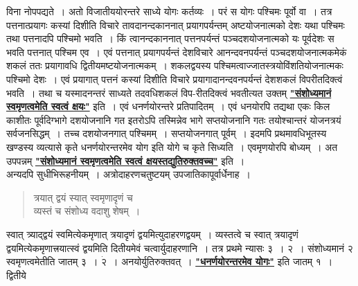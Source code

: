 \documentclass[11pt, openany]{book}
\begin{document}
\noindent विना नोपपद्यते~। अतो विजातीययोरन्तरे साध्ये योगः कर्तव्यः~। परं स योगः पश्चिमः पूर्वो वा~। तत्र पत्तनात्प्रयागः कस्यां दिशीति विचारे
तावदानन्दकाननात् प्रयागपर्यन्तम् अष्टयोजनात्मको देशः यथा पश्चिमः तथा पत्तनादपि पश्चिमो भवति~। किं त्वानन्दकाननात् पत्तनपर्यन्तं पञ्चदशयोजनात्मको यः पूर्वदेशः
स भवति पत्तनात् पश्चिम एव~। एवं पत्तनात् प्रयागपर्यन्तं देशविचारे
आनन्दवनपर्यन्तं पञ्चदशयोजनात्मकमेकं शकलं ततः प्रयागावधि
द्वितीयमष्टयोजनात्मकम्~। शकलद्वयस्य पश्चिमत्वाज्जातस्त्रयोविंशतियोजनात्मकः पश्चिमो देशः~। एवं प्रयागात् पत्तनं कस्यां दिशीति विचारे प्रयागादानन्दवनपर्यन्तं
देशशकलं विपरीतदिक्त्वं भवति~। तथा च यस्मादनन्तरं साध्यते तदवधिशकलं 
विप-रीतदिक्त्वं भवतीत्यत उक्तम् \hyperref[1.3]{\textbf{"संशोध्यमानं स्वमृणत्वमेति स्वत्वं क्षयः"}} इति~। एवं धनर्णयोरन्तरे प्रतिपादितम्~। एवं धनयोरपि तद्यथा एकः किल काशीतः पूर्वदिग्भागे दशयोजनानि गत इतरोऽपि तस्मिन्नेव भागे सप्तयोजनानि गतः तयोश्चान्तरं योजनत्रयं सर्वजनसिद्धम्~। तच्च दशयोजनगात् पश्चिमम्~। सप्तयोजनगात् पूर्वम्~। इदमपि प्रथमावधिभूतस्य खण्डस्य व्यत्यासे कृते धनर्णयोरन्तरमेव योग इति योगे च कृते सिध्यति~। एवमृणयोरपि बोध्यम्~। अत उपपन्नम् \hyperref[1.3]{\textbf{"संशोध्यमानं स्वमृणत्वमेति स्वत्वं क्षयस्तद्युतिरुक्तवच्च"}} इति~। \\

\vspace{-3mm}
 अन्यदपि सुधीभिरूहनीयम्~। अत्रोदाहरणचतुष्टयम् उपजातिकापूर्वार्धेनाह~। 
\begin{quote}
    \ex
     त्रयात् द्वयं स्यात् स्वमृणादृणं च \\
 
 \vspace{-7mm}
\hspace{1cm} व्यस्तं च संशोध्य वदाशु शेषम्~। 
\end{quote}

 स्वात् त्र्याद्द्वयं स्वमित्येकमृणात् त्रयादृणं द्वयमित्युदाहरणद्वयम्~।
व्यस्तत्वे च स्वात् त्रयादृणं द्वयमित्येकमृणात्त्रयात्स्वं द्वयमिति दितीयमेवं
चत्वार्युदाहरणानि~। तत्र प्रथमे न्यासः ३~। २~। संशोध्यमानं २ स्वमृणत्वमेतीति जातम् ३~। $\dot{\text{२}}$~। अनयोर्युतिरुक्तवत्~। \hyperref[1.3.1]{\textbf{"धनर्णयोरन्तरमेव योगः"}} इति जातम् १~। द्वितीये
\newpage
\end{document}
